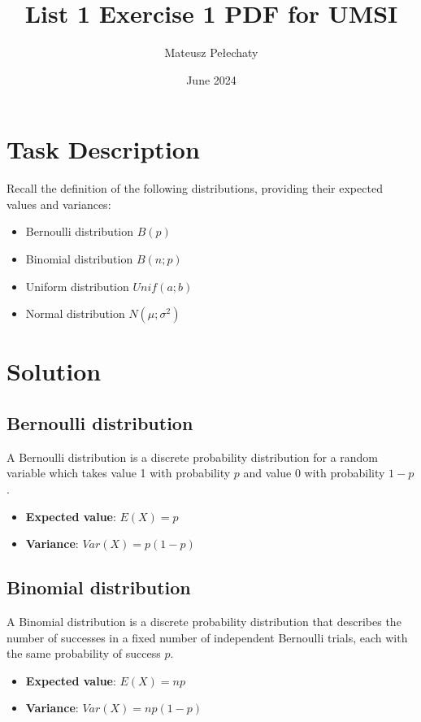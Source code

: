 \documentclass[11pt]{article}
\title{List 1 Exercise 1 PDF for UMSI}
\author{Mateusz Pełechaty}
\date{June 2024}
\begin{document}
\maketitle 

\section{Task Description}
Recall the definition of the following distributions, providing their expected values and variances:
\begin{itemize}
    \item Bernoulli distribution $B(p)$
    \item Binomial distribution $B(n; p)$
    \item Uniform distribution $Unif(a; b)$
    \item Normal distribution $N(\mu; \sigma^2)$
\end{itemize}

\section{Solution}

\subsection*{Bernoulli distribution}
A Bernoulli distribution is a discrete probability distribution for a random variable which takes value 1 with probability $p$ and value 0 with probability $1-p$.

\begin{itemize}
    \item \textbf{Expected value}: $E(X) = p$
    \item \textbf{Variance}: $Var(X) = p(1 - p)$
\end{itemize}

\subsection*{Binomial distribution}
A Binomial distribution is a discrete probability distribution that describes the number of successes in a fixed number of independent Bernoulli trials, each with the same probability of success $p$.

\begin{itemize}
    \item \textbf{Expected value}: $E(X) = np$
    \item \textbf{Variance}: $Var(X) = np(1 - p)$
\end{itemize}
\end{document}
